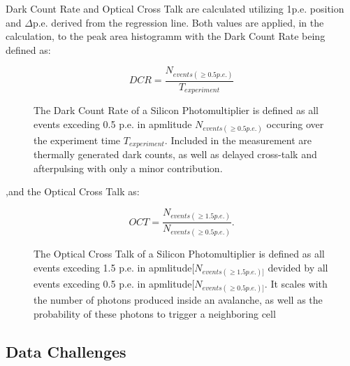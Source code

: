 \documentclass[12pt,article,type=msc,colorback,accentcolor=tud9c]{tudthesis}
\begin{document}
\newpage
Dark Count Rate and Optical Cross Talk are calculated utilizing 1p.e. position and $\Delta$p.e. derived from the regression line. Both values are applied, in the calculation, to the peak area histogramm with the Dark Count Rate being defined as:

\begin{figure}[h!]
\begin{equation}
DCR = \frac{N_{events(\geq 0.5p.e.)}}{T_{experiment}}
\end{equation}
\label{DCR_eq}
\caption{The Dark Count Rate of a Silicon Photomultiplier is defined as all events exceding 0.5 p.e. in apmlitude $N_{events(\geq 0.5p.e.)}$ occuring over the experiment time $T_{experiment}$. Included in the measurement are thermally generated dark counts, as well as delayed cross-talk and afterpulsing with only a minor contribution.}
\end{figure}
,and the Optical Cross Talk as:
\begin{figure}[h!]
\begin{equation}
OCT = \frac{N_{events(\geq 1.5p.e.)}}{N_{events(\geq 0.5p.e.)}}.
\end{equation}
\label{OCT_eq}
\caption{The Optical Cross Talk of a Silicon Photomultiplier is defined as all events exceding 1.5 p.e. in apmlitude$[N_{events(\geq 1.5p.e.)]}$ devided by all events exceding 0.5 p.e. in apmlitude$[N_{events(\geq 0.5p.e.)]}$. It scales with the number of photons produced inside an avalanche, as well as the probability of these photons to trigger a neighboring cell}
\end{figure}

\newpage
\subsection{Data Challenges}
\label{subsec:data_challenges}
\end{document}

